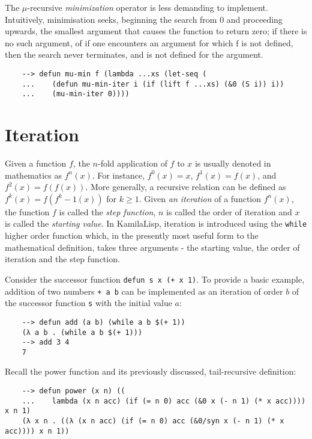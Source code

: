 The $\mu$-recursive \textit{minimization} operator is less demanding to implement. Intuitively, minimisation seeks, beginning the search from 0 and proceeding upwards, the smallest argument that causes the function to return zero; if there is no such argument, of if one encounters an argument for which f is not defined, then the search never terminates, and is not defined for the argument.

\begin{Verbatim}
    --> defun mu-min f (lambda ...xs (let-seq (
    ...    (defun mu-min-iter i (if (lift f ...xs) (&0 (S i)) i))
    ...    (mu-min-iter 0))))
\end{Verbatim}

\section{Iteration}

Given a function $f$, the $n$-fold application of $f$ to $x$ is usually denoted in mathematics as $f^n(x)$. For instance, $f^0(x) = x$, $f^1(x) = f(x)$, and $f^2(x) = f(f(x))$. More generally, a recursive relation can be defined as $f^k(x) = f(f^k-1(x))$ for $k \ge 1$. Given \textit{an iteration} of a function $f^n(x)$, the function $f$ is called the \textit{step function}, $n$ is called the order of iteration and $x$ is called the \textit{starting value}. In KamilaLisp, iteration is introduced using the \verb|while| higher order function which, in the presently most useful form to the mathematical definition, takes three arguments - the starting value, the order of iteration and the step function.

Consider the successor function \verb|defun s x (+ x 1)|. To provide a basic example, addition of two numbers \verb|+ a b| can be implemented as an iteration of order $b$ of the successor function \verb|s| with the initial value $a$:

\begin{Verbatim}
    --> defun add (a b) (while a b $(+ 1))
    (λ a b . (while a b $(+ 1)))
    --> add 3 4
    7
\end{Verbatim}

Recall the power function and its previously discussed, tail-recursive definition:

\begin{Verbatim}
    --> defun power (x n) ((
    ...    lambda (x n acc) (if (= n 0) acc (&0 x (- n 1) (* x acc)))) x n 1)
    (λ x n . ((λ (x n acc) (if (= n 0) acc (&0/syn x (- n 1) (* x acc)))) x n 1))
\end{Verbatim}

